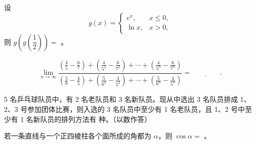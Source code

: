 \begin{question}
设
\nopagebreak[4]
\[
g(x)=\begin{cases}e^x,&x\leq0,\\\ln x,&x>0,\end{cases}
\]
则 $g\left(g\left(\dfrac12\right)\right)=$ \gkblank{}。

\end{question}
\begin{question}
\nopagebreak[4]
\[
\lim_{n\to\infty}\frac{\left(\frac45-\frac67\right)+\left(\frac{4}{5^2}-\frac{6}{7^2}\right)+\cdots+\left(\frac{4}{5^n}-\frac{6}{7^n}\right)}{\left(\frac56-\frac45\right)+\left(\frac{5}{6^2}-\frac{4}{5^2}\right)+\cdots+\left(\frac{5}{6^n}-\frac{4}{5^n}\right)}=\underline{\qquad\qquad}.
\]

\end{question}
\begin{question}
5 名乒乓球队员中，有 2 名老队员和 3 名新队员。现从中选出 3 名队员排成 1、2、3 号参加团体比赛，则入选的 3 名队员中至少有 1 名老队员，且 1、2 号中至少有 1 名新队员的排列方法有 \gkblank{} 种。（以数作答）

\end{question}
\begin{question}
若一条直线与一个正四棱柱各个面所成的角都为 $\alpha$，则 $\cos\alpha=$ \gkblank{}。

\end{question}

